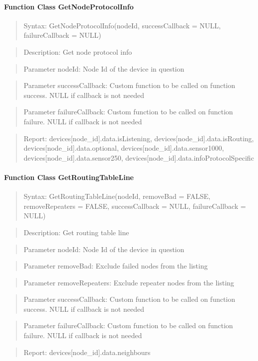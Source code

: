 \paragraph{Function Class GetNodeProtocolInfo}
\begin{quote}Syntax: GetNodeProtocolInfo(nodeId, successCallback = NULL, failureCallback = NULL)\end{quote}
\begin{quote}Description: Get node protocol info\end{quote}
\begin{quote}Parameter nodeId: Node Id of the device in question\end{quote}
\begin{quote}Parameter successCallback: Custom function to be called on function success. NULL if callback is not needed\end{quote}
\begin{quote}Parameter failureCallback: Custom function to be called on function failure. NULL if callback is not needed\end{quote}
\begin{quote}Report: devices[node\_id].data.isListening, devices[node\_id].data.isRouting, devices[node\_id].data.optional, devices[node\_id].data.sensor1000, devices[node\_id].data.sensor250, devices[node\_id].data.infoProtocolSpecific\end{quote}

\paragraph{Function Class GetRoutingTableLine}
\begin{quote}Syntax: GetRoutingTableLine(nodeId, removeBad = FALSE, removeRepeaters = FALSE, successCallback = NULL, failureCallback = NULL)\end{quote}
\begin{quote}Description: Get routing table line\end{quote}
\begin{quote}Parameter nodeId: Node Id of the device in question\end{quote}
\begin{quote}Parameter removeBad: Exclude failed nodes from the listing\end{quote}
\begin{quote}Parameter removeRepeaters: Exclude repeater nodes from the listing\end{quote}
\begin{quote}Parameter successCallback: Custom function to be called on function success. NULL if callback is not needed\end{quote}
\begin{quote}Parameter failureCallback: Custom function to be called on function failure. NULL if callback is not needed\end{quote}
\begin{quote}Report: devices[node\_id].data.neighbours\end{quote}

